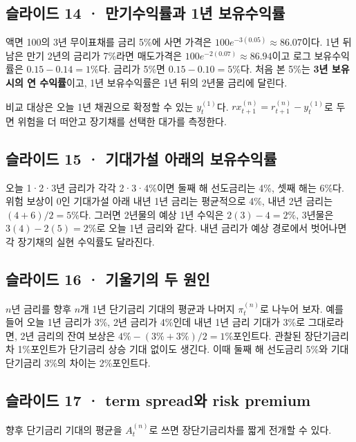 \documentclass[11pt,a4paper]{article}
\begin{document}
\subsection{슬라이드 14 · 만기수익률과 1년 보유수익률}
액면 100의 3년 무이표채를 금리 5\%에 사면 가격은 $100e^{-3(0.05)}\approx86.07$이다. 1년 뒤 남은 만기 2년의 금리가 7\%라면 매도가격은 $100e^{-2(0.07)}\approx86.94$이고 로그 보유수익률은 $0.15-0.14=1\%$다. 금리가 5\%면 $0.15-0.10=5\%$다. 처음 본 5\%는 \textbf{3년 보유 시의 연 수익률}이고, 1년 보유수익률은 1년 뒤의 2년물 금리에 달린다.\par

비교 대상은 오늘 1년 채권으로 확정할 수 있는 $y_t^{(1)}$다. $rx_{t+1}^{(n)}=r_{t+1}^{(n)}-y_t^{(1)}$로 두면 위험을 더 떠안고 장기채를 선택한 대가를 측정한다.\par

\subsection{슬라이드 15 · 기대가설 아래의 보유수익률}
오늘 1·2·3년 금리가 각각 2·3·4\%이면 둘째 해 선도금리는 4\%, 셋째 해는 6\%다. 위험 보상이 0인 기대가설 아래 내년 1년 금리는 평균적으로 4\%, 내년 2년 금리는 $(4+6)/2=5\%$다. 그러면 2년물의 예상 1년 수익은 $2(3)-4=2\%$, 3년물은 $3(4)-2(5)=2\%$로 오늘 1년 금리와 같다. 내년 금리가 예상 경로에서 벗어나면 각 장기채의 실현 수익률도 달라진다.\par

\subsection{슬라이드 16 · 기울기의 두 원인}
$n$년 금리를 향후 $n$개 1년 단기금리 기대의 평균과 나머지 $\pi_t^{(n)}$로 나누어 보자. 예를 들어 오늘 1년 금리가 3\%, 2년 금리가 4\%인데 내년 1년 금리 기대가 3\%로 그대로라면, 2년 금리의 잔여 보상은 $4\%-(3\%+3\%)/2=1\%$포인트다. 관찰된 장단기금리차 1\%포인트가 단기금리 상승 기대 없이도 생긴다. 이때 둘째 해 선도금리 5\%와 기대 단기금리 3\%의 차이는 2\%포인트다.\par

\subsection{슬라이드 17 · term spread와 risk premium}
향후 단기금리 기대의 평균을 $A_t^{(n)}$로 쓰면 장단기금리차를 짧게 전개할 수 있다.\par
\end{document}
